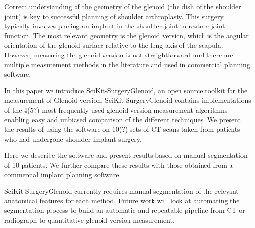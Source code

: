 
Correct understanding of the geometry of the glenoid (the dish of the shoulder joint) is 
key to successful planning of shoulder arthroplasty. This surgery typically involves 
placing an implant in the shoulder joint to restore joint function. The most relevant 
geometry is the glenoid version, which is the angular orientation of the glenoid surface 
relative to the long axis of the scapula. However, measuring the glenoid version is not 
straightforward and there are multiple measurement methods in the literature and used in 
commercial planning software. 

In this paper we introduce SciKit-SurgeryGlenoid, an open source toolkit for the measurement
of Glenoid version. SciKit-SurgeryGlenoid contains implementations of the 4(5?) most 
frequently used glenoid version measurement algorithms enabling easy and unbiased comparison of 
the different techniques. We present the results of using the software on 10(?) sets of
CT scans taken from patients who had undergone shoulder implant surgery.    

Here we describe the software and present results based on manual segmentation of 10 
patients. We further compare these results with those obtained from a commercial 
implant planning software. 

SciKit-SurgeryGlenoid currently requires manual segmentation of the relevant anatomical 
features for each method. Future work will look at automating the segmentation process
 to build an automatic and repeatable 
pipeline from {CT} or radiograph to quantitative glenoid version measurement.
